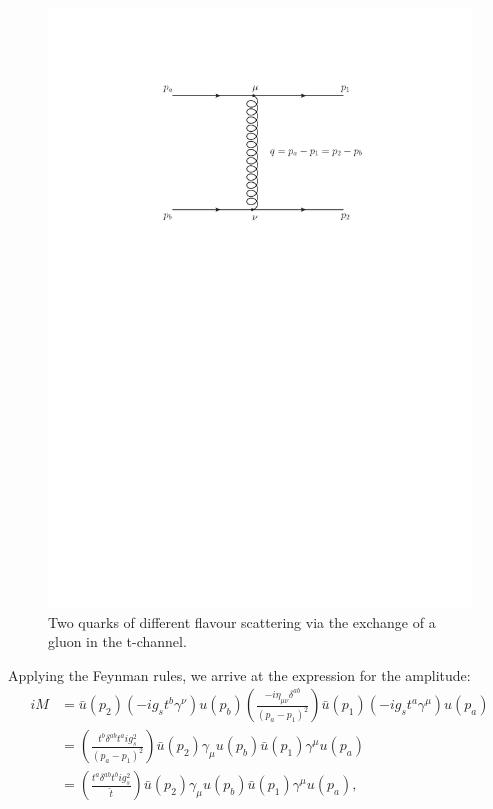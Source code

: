 \begin{figure}[t]
\centering
\includegraphics[scale=0.75]{Images/qQ_t.pdf} 
\caption{Two quarks of different flavour scattering via the exchange of a gluon in the t-channel.}
\label{fig:qQqQ}
\end{figure}

Applying the Feynman rules, we arrive at the expression for the amplitude:
\begin{equation}
\begin{split}
iM &= \bar{u}(p_2) (-i g_s t^b \gamma^\nu)u(p_b) \left(\frac{-i \eta_{\mu \nu} \delta^{ab}}{(p_a-p_1)^2} \right)\bar{u}(p_1)(-i g_s t^a \gamma^\mu) u(p_a) \\
&= \left(\frac{t^b \delta^{ab} t^a i g_s^2 }{(p_a-p_1)^2}\right) \bar{u}(p_2) \gamma_\mu u(p_b) \bar{u}(p_1)\gamma^\mu u(p_a) \\
&= \left(\frac{t^a \delta^{ab} t^b i g_s^2 }{\hat{t}}\right) \bar{u}(p_2) \gamma_\mu u(p_b) \bar{u}(p_1)\gamma^\mu u(p_a),
\end{split}
\end{equation}

